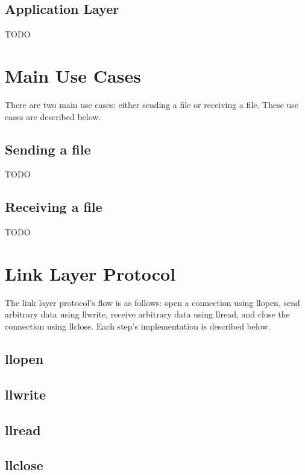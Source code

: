 \documentclass[11pt,a4paper]{article}
\begin{document}
\subsection{Application Layer}

TODO

\section{Main Use Cases}

There are two main use cases: either sending a file or receiving a file.
These use cases are described below.

\subsection{Sending a file}

TODO

\subsection{Receiving a file}

TODO

\section{Link Layer Protocol}

The link layer protocol's flow is as follows: open a connection using llopen, send arbitrary data using llwrite, receive arbitrary data using llread, and close the connection using llclose. Each step's implementation is described below.

\subsection{llopen}

\subsection{llwrite}

\subsection{llread}

\subsection{llclose}
\end{document}
